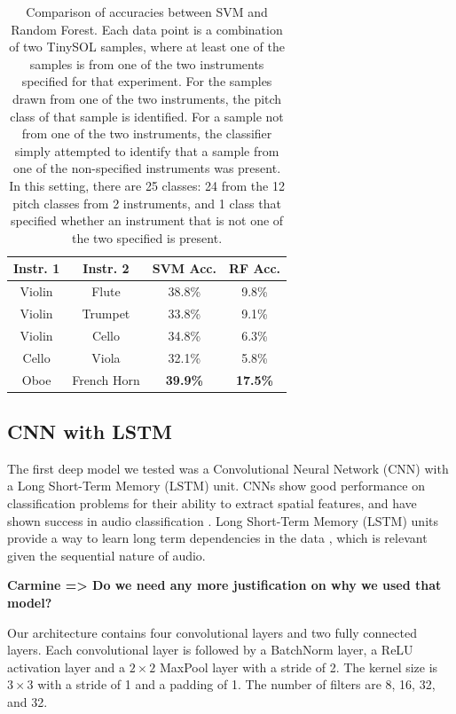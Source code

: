 \documentclass{article}
\newcommand{\carmine}[1]{\textbf{\color{red} Carmine => #1}}
\begin{document}
\begin{table}
  \begin{center}
    \label{tab:table1}
    \begin{tabular}{|c|c|c|c|} 
    	  \hline
      \textbf{Instr. 1} & \textbf{Instr. 2} & \textbf{SVM Acc.} & \textbf{RF Acc.}\\
      \hline
      Violin & Flute & 38.8\% & 9.8\% \\
      \hline
      Violin & Trumpet & 33.8\% & 9.1\% \\
      \hline
      Violin & Cello & 34.8\% & 6.3\% \\
      \hline
      Cello & Viola & 32.1\% & 5.8\% \\
      \hline
      Oboe & French Horn & \textbf{39.9\%} & \textbf{17.5\%} \\
      \hline
    \end{tabular}
  \end{center}
  \caption{Comparison of accuracies between SVM and Random Forest. Each data point is a combination of two TinySOL samples, where at least one of the samples is from one of the two instruments specified for that experiment. For the samples drawn from one of the two instruments, the pitch class of that sample is identified. For a sample not from one of the two instruments, the classifier simply attempted to identify that a sample from one of the non-specified instruments was present. In this setting, there are 25 classes: 24 from the 12 pitch classes from 2 instruments, and 1 class that specified whether an instrument that is not one of the two specified is present.}
\end{table}


\subsection{CNN with LSTM}

The first deep model we tested was a Convolutional Neural Network (CNN) with a Long Short-Term Memory (LSTM) unit. CNNs show good performance on classification problems for their ability to extract spatial features, and have shown success in audio classification \cite{Hershey16}. Long Short-Term Memory (LSTM) units provide a way to learn long term dependencies in the data \cite{Hochreiter97}, which is relevant given the sequential nature of audio.

\carmine{Do we need any more justification on why we used that model?}

Our architecture contains four convolutional layers and two fully connected layers. Each convolutional layer is followed by a BatchNorm layer, a ReLU activation layer and a $2 \times 2$  MaxPool layer with a stride of 2. The kernel size is $3 \times 3$ with a stride of 1 and a padding of 1. The number of filters are 8, 16, 32, and 32.
\end{document}
